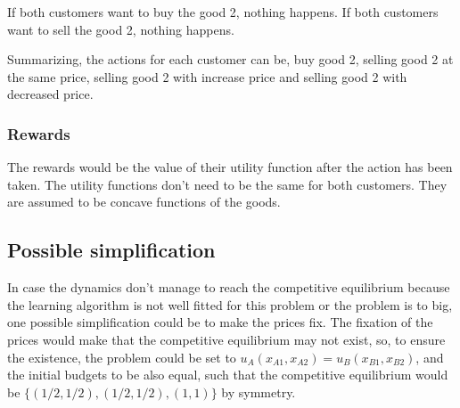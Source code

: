 \documentclass{article}
\begin{document}
If both customers want to buy the good 2, nothing happens. If both customers want to sell the good 2, nothing happens.  

Summarizing, the actions for each customer can be, buy good 2, selling good 2 at the same price, selling good 2 with increase price and selling good 2 with decreased price. 

\subsubsection*{Rewards}
The rewards would be the value of their utility function after the action has been taken. The utility functions don't need to be the same for both customers. They are assumed to be concave functions of the goods. 

\subsection*{Possible simplification }
In case the dynamics don't manage to reach the competitive equilibrium because the learning algorithm is not well fitted for this problem or the problem is to big, one possible simplification could be to make the prices fix. The fixation of the prices would make that the competitive equilibrium may not exist, so, to ensure the existence, the problem could be set to $u_A(x_{A1},x_{A2})=u_B(x_{B1},x_{B2})$, and the initial budgets to be also equal, such that the competitive equilibrium would be $\{ (1/2,1/2),(1/2,1/2),(1,1)   \}$ by symmetry. 

\printbibliography
\end{document}

